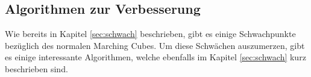 \subsection{Algorithmen zur Verbesserung} 
Wie bereits in Kapitel \ref{sec:schwach} beschrieben, gibt es einige Schwachpunkte bezüglich des normalen Marching Cubes. Um diese Schwächen auszumerzen, gibt es einige interessante Algorithmen, welche ebenfalls im Kapitel \ref{sec:schwach} kurz beschrieben sind. 